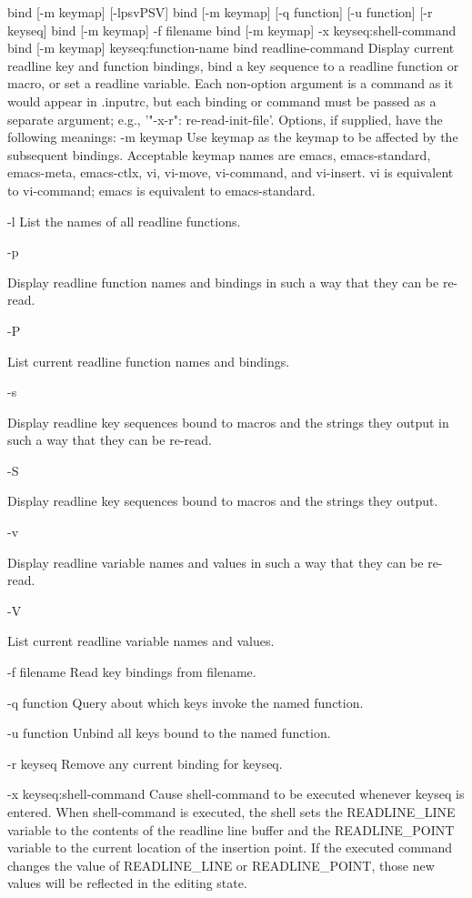 bind [-m keymap] [-lpsvPSV]
bind [-m keymap] [-q function] [-u function] [-r keyseq]
bind [-m keymap] -f filename
bind [-m keymap] -x keyseq:shell-command
bind [-m keymap] keyseq:function-name
bind readline-command
Display current readline key and function bindings, bind a key sequence to a readline function or macro, or set a readline variable. Each non-option argument is a command as it would appear in .inputrc, but each binding or command must be passed as a separate argument; e.g., '"\C-x\C-r": re-read-init-file'. Options, if supplied, have the following meanings:
-m keymap
Use keymap as the keymap to be affected by the subsequent bindings. Acceptable keymap names are emacs, emacs-standard, emacs-meta, emacs-ctlx, vi, vi-move, vi-command, and vi-insert. vi is equivalent to vi-command; emacs is equivalent to emacs-standard.

-l
List the names of all readline functions.

-p

Display readline function names and bindings in such a way that they can be re-read.

-P

List current readline function names and bindings.

-s

Display readline key sequences bound to macros and the strings they output in such a way that they can be re-read.

-S

Display readline key sequences bound to macros and the strings they output.

-v

Display readline variable names and values in such a way that they can be re-read.

-V

List current readline variable names and values.

-f filename
Read key bindings from filename.

-q function
Query about which keys invoke the named function.

-u function
Unbind all keys bound to the named function.

-r keyseq
Remove any current binding for keyseq.

-x keyseq:shell-command
Cause shell-command to be executed whenever keyseq is entered. When shell-command is executed, the shell sets the READLINE\_LINE variable to the contents of the readline line buffer and the READLINE\_POINT variable to the current location of the insertion point. If the executed command changes the value of READLINE\_LINE or READLINE\_POINT, those new values will be reflected in the editing state.

